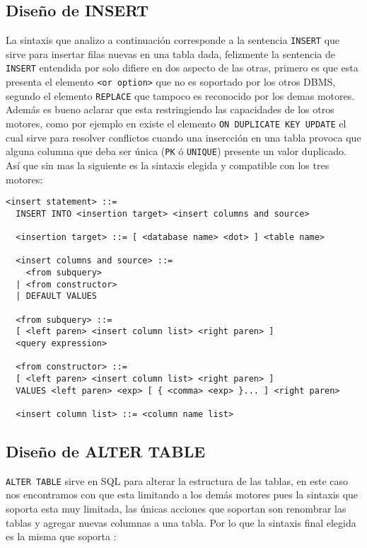 \subsection{Diseño de INSERT}
La sintaxis que analizo a continuación corresponde a la sentencia \verb=INSERT= que sirve para insertar filas nuevas en una tabla dada, felizmente la sentencia de \verb=INSERT= entendida por \s solo difiere en dos aspecto de las otras, primero es que esta presenta el elemento \verb=<or option>= que no es soportado por los otros DBMS, segundo el elemento \verb=REPLACE= que tampoco es reconocido por los demas motores. Además es bueno aclarar que \s esta restringiendo las capacidades de los otros motores, como por ejemplo en \m existe el elemento \verb=ON DUPLICATE KEY UPDATE= el cual sirve para resolver conflictos cuando una insercción en una tabla provoca que alguna columna que deba ser única (\verb=PK= ó \verb=UNIQUE=) presente un valor duplicado. Así que sin mas la siguiente es la sintaxis elegida y compatible con los tres motores:

\begin{Verbatim}[frame=single, label=sintaxis para INSERT]
  <insert statement> ::=
  INSERT INTO <insertion target> <insert columns and source>

  <insertion target> ::= [ <database name> <dot> ] <table name>

  <insert columns and source> ::=
    <from subquery>
  | <from constructor>
  | DEFAULT VALUES

  <from subquery> ::=
  [ <left paren> <insert column list> <right paren> ]
  <query expression>
  
  <from constructor> ::=
  [ <left paren> <insert column list> <right paren> ]
  VALUES <left paren> <exp> [ { <comma> <exp> }... ] <right paren>

  <insert column list> ::= <column name list>
\end{Verbatim}




\subsection{Diseño de ALTER TABLE}
\verb=ALTER TABLE= sirve en SQL para alterar la estructura de las tablas, en este caso nos encontramos con que \s esta limitando a los demás motores pues la sintaxis que soporta esta muy limitada, las únicas acciones que soportan son renombrar las tablas y agregar nuevas columnas a una tabla. Por lo que la sintaxis final elegida es la misma que soporta \s:\\

